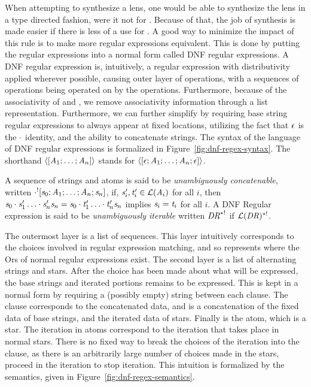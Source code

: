 \documentclass[numbers]{sigplanconf}
\begin{document}
When attempting to synthesize a lens, one would be able to synthesize the lens
in a type directed fashion, were it not for \RewriteRegexLensRule{}.
Because of that, the job of synthesis is made easier if there is less of a use
for \RewriteRegexLensRule{}.
A good way to minimize the impact of this rule is to make more
regular expressions equivalent.  This is done by putting the regular expressions
into a normal form called DNF regular expressions.
A DNF regular expression is, intuitively, a regular expression with
distributivity applied wherever possible, causing outer layer of \Or{} operations,
with a sequences of \Concat{} operations being operated on by the \Or{} operations.
Furthermore, because of the associativity of \Or{} and \Concat{}, we
remove associativity information through a list representation.
Furthermore, we can further simplify by requiring
base string regular expressions to always appear at fixed locations,
utilizing the fact that $\epsilon{}$ is the $\cdot$ identity, and
the ability to concatenate strings.
The syntax of the language of DNF regular expressions is formalized in Figure~\ref{fig:dnf-regex-syntax}.
The shorthand $\langle[\mathit{A}_1;\ldots;\mathit{A}_n]\rangle$
stands for
$\langle[\epsilon;\mathit{A}_1;\ldots;\mathit{A}_n;\epsilon]\rangle$.

A sequence of strings and atoms is said to be \textit{unambiguously concatenable},
written $\cdot^![\mathit{s}_0;\mathit{A}_1;\ldots;\mathit{A}_n;\mathit{s}_n]$,
if, $\mathit{s}_i',\mathit{t}_i'\in\mathcal{L}(\mathit{A}_i)$ for all $i$, then
$\mathit{s}_0\cdot\mathit{s}_1'\ldots\cdot\mathit{s}_n'\mathit{s}_n=
\mathit{s}_0\cdot\mathit{t}_1'\ldots\cdot\mathit{t}_n'\mathit{s}_n$
implies $\mathit{s}_i=\mathit{t}_i$ for all $i$.  A DNF Regular expression is said
to be \textit{unambiguously iterable} written $\mathit{DR}^{*!}$ if
$\mathcal{L}(\mathit{DR})^{*!}$.

The outermost layer is a list of sequences.
This layer intuitively corresponds to the choices involved in regular expression matching, and so represents where the Ors of normal regular expressions exist.
The second layer is a list of alternating strings and stars.
After the choice has been made about what will be expressed,
the base strings and iterated portions remains to be expressed.
This is kept in a normal form by requiring a (possibly empty) string between
each clause.
The clause corresponds to the concatenated data, and is a concatenation of the
fixed data of base strings, and the iterated data of stars.
Finally is the atom, which is a star.
The iteration in atoms correspond to the iteration that takes place in normal stars.
There is no fixed way to break the choices of the iteration into the clause,
as there is an arbitrarily large number of choices made in the stars, proceed
in the iteration to stop iteration.
This intuition is formalized by the semantics, given in
Figure~\ref{fig:dnf-regex-semantics}.
\end{document}
